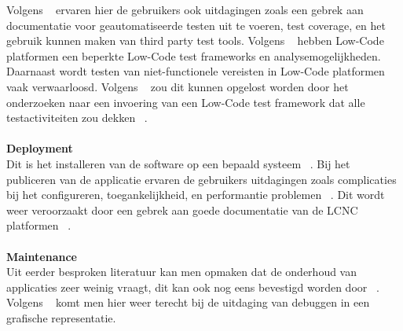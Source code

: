 Volgens ~\textcite{Rokis_2022} ervaren hier de gebruikers ook uitdagingen zoals een gebrek aan documentatie voor geautomatiseerde testen uit te voeren, 
test coverage, en het gebruik kunnen maken van third party test tools. 
Volgens ~\textcite{Rokis_2022} hebben Low-Code platformen een beperkte Low-Code test frameworks en analysemogelijkheden. 
Daarnaast wordt testen van niet-functionele vereisten in Low-Code platformen vaak verwaarloosd. 
Volgens ~\textcite{Rokis_2022} zou dit kunnen opgelost worden door het onderzoeken naar een invoering van een Low-Code test framework dat alle testactiviteiten zou dekken ~\autocite{Rokis_2022}.
\\
\\
\textbf{Deployment}
\\
Dit is het installeren van de software op een bepaald systeem ~\autocite{Ghumatkar_2023}.
Bij het publiceren van de applicatie ervaren de gebruikers uitdagingen zoals complicaties bij het configureren, toegankelijkheid, en performantie problemen ~\autocite{Rokis_2022}. 
Dit wordt weer veroorzaakt door een gebrek aan goede documentatie van de LCNC platformen ~\autocite{Rokis_2022}.
\\
\\
\textbf{Maintenance}
\\
Uit eerder besproken literatuur kan men opmaken dat de onderhoud van applicaties zeer weinig vraagt, dit kan ook nog eens bevestigd worden door ~\textcite{Rokis_2022}.
Volgens ~\textcite{Rokis_2022} komt men hier weer terecht bij de uitdaging van debuggen in een grafische representatie.


